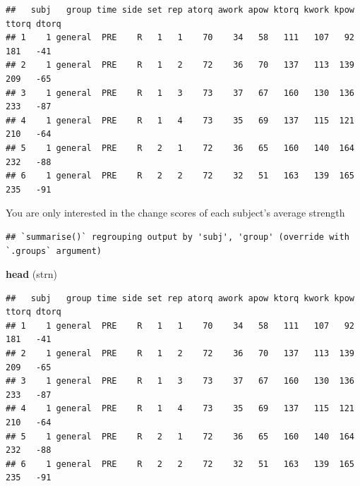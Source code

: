 \documentclass[
]{book}
\newenvironment{Shaded}{\begin{snugshade}}{\end{snugshade}}
\newcommand{\CommentTok}[1]{\textcolor[rgb]{0.56,0.35,0.01}{\textit{#1}}}
\newcommand{\DataTypeTok}[1]{\textcolor[rgb]{0.13,0.29,0.53}{#1}}
\newcommand{\KeywordTok}[1]{\textcolor[rgb]{0.13,0.29,0.53}{\textbf{#1}}}
\newcommand{\NormalTok}[1]{#1}
\newcommand{\OperatorTok}[1]{\textcolor[rgb]{0.81,0.36,0.00}{\textbf{#1}}}
\newcommand{\StringTok}[1]{\textcolor[rgb]{0.31,0.60,0.02}{#1}}
\begin{document}
\begin{verbatim}
##   subj   group time side set rep atorq awork apow ktorq kwork kpow ttorq dtorq
## 1    1 general  PRE    R   1   1    70    34   58   111   107   92   181   -41
## 2    1 general  PRE    R   1   2    72    36   70   137   113  139   209   -65
## 3    1 general  PRE    R   1   3    73    37   67   160   130  136   233   -87
## 4    1 general  PRE    R   1   4    73    35   69   137   115  121   210   -64
## 5    1 general  PRE    R   2   1    72    36   65   160   140  164   232   -88
## 6    1 general  PRE    R   2   2    72    32   51   163   139  165   235   -91
\end{verbatim}

You are only interested in the change scores of each subject's average strength

\begin{Shaded}
\end{Shaded}

\begin{verbatim}
## `summarise()` regrouping output by 'subj', 'group' (override with `.groups` argument)
\end{verbatim}

\begin{Shaded}
\begin{Highlighting}[]
\KeywordTok{head}\NormalTok{ (strn)}
\end{Highlighting}
\end{Shaded}

\begin{verbatim}
##   subj   group time side set rep atorq awork apow ktorq kwork kpow ttorq dtorq
## 1    1 general  PRE    R   1   1    70    34   58   111   107   92   181   -41
## 2    1 general  PRE    R   1   2    72    36   70   137   113  139   209   -65
## 3    1 general  PRE    R   1   3    73    37   67   160   130  136   233   -87
## 4    1 general  PRE    R   1   4    73    35   69   137   115  121   210   -64
## 5    1 general  PRE    R   2   1    72    36   65   160   140  164   232   -88
## 6    1 general  PRE    R   2   2    72    32   51   163   139  165   235   -91
\end{verbatim}
\end{document}

